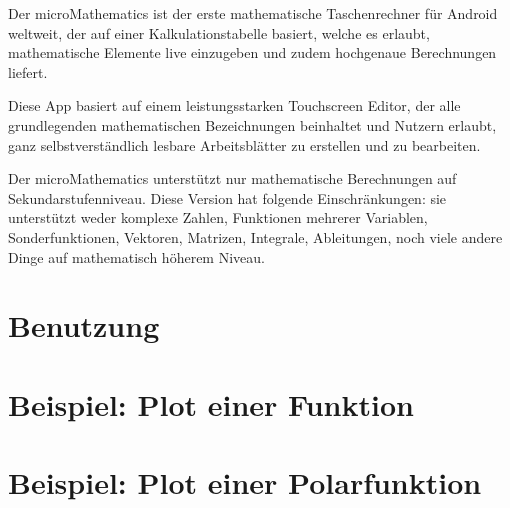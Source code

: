 \documentclass[DIV=calc, paper=a4, fontsize=11pt, twocolumn]{scrartcl}
\begin{document}
\maketitle
\thispagestyle{fancy} %

\begin{bf}
Der microMathematics ist der erste mathematische
Taschenrechner für Android weltweit, der auf einer Kalkulationstabelle basiert,
welche es erlaubt, mathematische Elemente live einzugeben und zudem hochgenaue
Berechnungen liefert.

Diese App basiert auf einem leistungsstarken Touchscreen Editor, der alle
grundlegenden mathematischen Bezeichnungen beinhaltet und Nutzern erlaubt, ganz
selbstverständlich lesbare Arbeitsblätter zu erstellen und zu bearbeiten.

Der microMathematics unterstützt nur mathematische Berechnungen auf
Sekundarstufenniveau. Diese Version hat folgende Einschränkungen: sie
unterstützt weder komplexe Zahlen, Funktionen mehrerer Variablen,
Sonderfunktionen, Vektoren, Matrizen, Integrale, Ableitungen, noch viele andere
Dinge auf mathematisch höherem Niveau.
\end{bf}

\section{Benutzung}


\section{Beispiel: Plot einer Funktion}


\section{Beispiel: Plot einer Polarfunktion}

\end{document}

